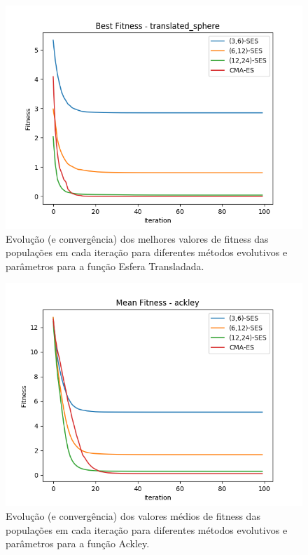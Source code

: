 \documentclass[conference]{IEEEtran}
\begin{document}
\begin{figure}[htbp]
\centering
\centerline{\includegraphics[scale=0.4]{imagens/translated_sphere/best_fitness.png}}
\caption{Evolução (e convergência) dos melhores valores de fitness das populações em cada iteração para diferentes métodos evolutivos e parâmetros para a função Esfera Transladada.}
\label{translated_sphere/best_fitness}
\end{figure}

\begin{figure}[htbp]
\centering
\centerline{\includegraphics[scale=0.4]{imagens/ackley/mean_fitness.png}}
\caption{Evolução (e convergência) dos valores médios de fitness das populações em cada iteração para diferentes métodos evolutivos e parâmetros para a função Ackley.}
\label{ackley/mean_fitness}
\end{figure}
\end{document}
